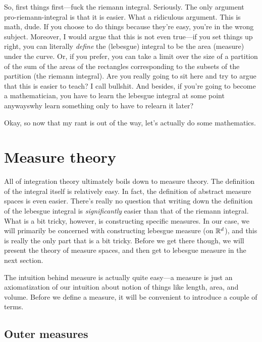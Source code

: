 So, first things first---fuck the riemann integral.  Seriously.  The only argument pro-riemann-integral is that it is easier.  What a ridiculous argument.  This is math, dude.  If you choose to do things because they're easy, you're in the wrong subject.  Moreover, I would argue that this is not even true---if you set things up right, you can literally \emph{define} the (lebesgue) integral to be the area (measure) under the curve.  Or, if you prefer, you can take a limit over the size of a partition of the sum of the areas of the rectangles corresponding to the subsets of the partition (the riemann integral).  Are you really going to sit here and try to argue that this is easier to teach?  I call bullshit.  And besides, if you're going to become a mathematician, you have to learn the lebesgue integral at some point anyways\textellipsis why learn something only to have to relearn it later?

Okay, so now that my rant is out of the way, let's actually do some mathematics.

\section{Measure theory}

All of integration theory ultimately boils down to measure theory.  The definition of the integral itself is relatively easy.  In fact, the definition of abstract measure spaces is even easier.  There's really no question that writing down the definition of the lebesgue integral is \emph{significantly} easier than that of the riemann integral.  What is a bit tricky, however, is constructing specific measures.  In our case, we will primarily be concerned with constructing lebesgue measure (on $\mathbb{R} ^d$), and this is really the only part that is a bit tricky.  Before we get there though, we will present the theory of measure spaces, and then get to lebesgue measure in the next section.

The intuition behind measure is actually quite easy---a measure is just an axiomatization of our intuition about notion of things like length, area, and volume.  Before we define a measure, it will be convenient to introduce a couple of terms.

\subsection{Outer measures}

